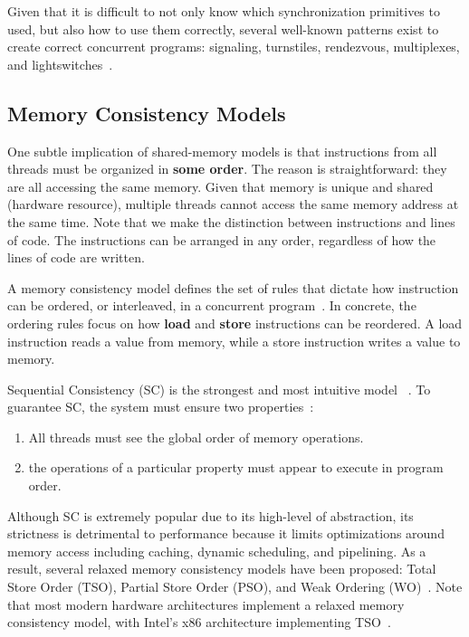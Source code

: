 Given that it is difficult to not only know which synchronization
primitives to used, but also how to use them correctly,
several well-known patterns exist to create
correct concurrent programs: signaling,
turnstiles, rendezvous, multiplexes, and lightswitches~\cite{csf2025synchronizationDesign}.

\subsection{Memory Consistency Models}
One subtle implication of shared-memory models is that instructions
from all threads must be organized in \textbf{some order}. The reason is straightforward:
they are all accessing the same memory. Given that memory is unique and shared (hardware resource),
multiple threads cannot access the same memory address at the same time. Note that
we make the distinction between instructions and lines of code. The instructions
can be arranged in any order, regardless of how the lines of code are written.

A memory consistency model defines the set of rules that dictate how
instruction can be ordered, or interleaved, in a concurrent
program~\cite{bornholt2016memoryModels,jaffe2011impactOfMemoryModels}.
In concrete, the ordering rules focus on how \textbf{load} and \textbf{store} instructions
can be reordered. A load instruction reads a value from memory,
while a store instruction writes a value to memory.

Sequential Consistency (SC) is the strongest
and most intuitive model ~\cite{lamport1979multiprocessor}.
To guarantee SC, the system must ensure two properties~\cite{jaffe2011impactOfMemoryModels}:
\begin{enumerate}
    \item All threads must see the global order of memory operations.
    \item the operations of a particular property must appear to execute
    in program order.
\end{enumerate}

Although SC is extremely popular due to its high-level of abstraction,
its strictness is detrimental to performance because it limits
optimizations around memory access including caching,
dynamic scheduling, and pipelining. As a result, several relaxed
memory consistency models have been proposed:
Total Store Order (TSO), Partial Store Order (PSO),
and Weak Ordering (WO)~\cite{jaffe2011impactOfMemoryModels}.
Note that most modern hardware architectures implement a relaxed
memory consistency model, with Intel's x86 architecture implementing TSO~\cite{cox2021hardwareMemoryModels}.

